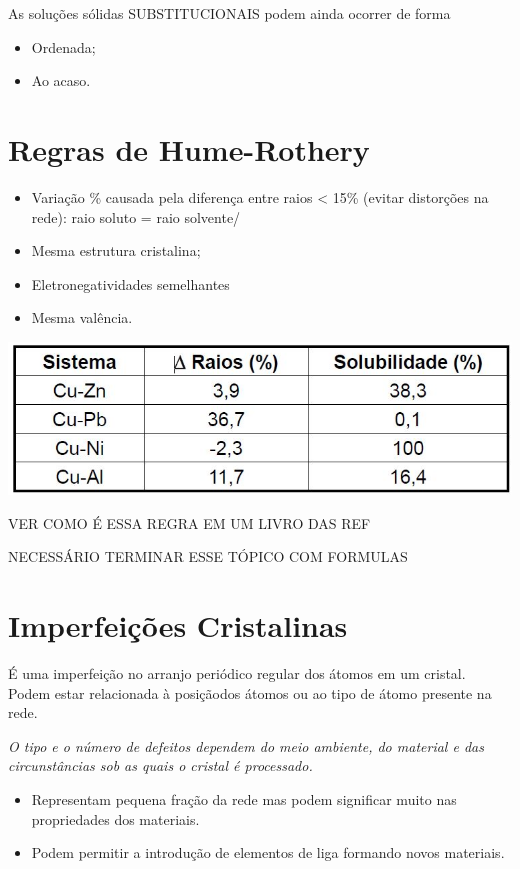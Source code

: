 As soluções sólidas SUBSTITUCIONAIS podem ainda ocorrer de forma 

\begin{itemize}
	\item Ordenada;
	\item Ao acaso.
\end{itemize}

\section{Regras de Hume-Rothery}

\begin{itemize}
	\item Variação \% causada pela diferença entre raios < 15\% (evitar distorções na rede): raio soluto = raio solvente/
	\item Mesma estrutura cristalina;
	\item Eletronegatividades semelhantes
	\item Mesma valência.
\end{itemize}



\includegraphics[scale=0.27,trim={0 0 0 0}]{figures/hume}


{\LARGE VER COMO É ESSA REGRA EM UM LIVRO DAS REF}

{\LARGE NECESSÁRIO TERMINAR ESSE TÓPICO COM FORMULAS}


\section{Imperfeições Cristalinas}

É uma imperfeição no arranjo periódico regular dos átomos em um cristal. Podem estar relacionada à posiçãodos átomos ou ao tipo de átomo presente na rede.

\textit{O tipo e o número de defeitos dependem do meio ambiente, do material e das circunstâncias sob as quais o cristal é processado.}

\begin{itemize}
	\item Representam pequena fração da rede mas podem significar muito nas propriedades dos materiais.
	\item Podem permitir a introdução de elementos de liga formando novos materiais.
\end{itemize}

